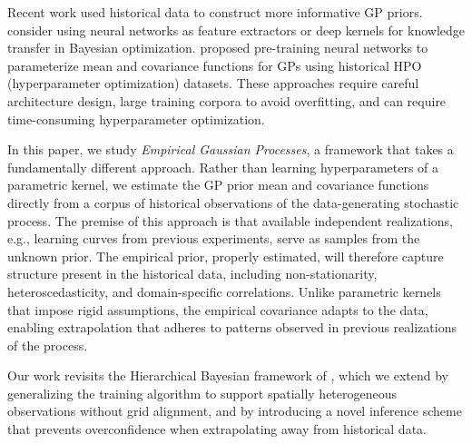 \documentclass{article}
\begin{document}
Recent work used historical data to construct more informative GP priors.
\citet{perrone2018scalable,wistuba2021few} consider using neural networks as feature extractors or deep kernels for knowledge transfer in Bayesian optimization. \citet{wang2024hyperbo} proposed pre-training neural networks to parameterize mean and covariance functions for GPs using historical HPO (hyperparameter optimization) datasets. These approaches require careful architecture design, large training corpora to avoid overfitting, and can require time-consuming hyperparameter optimization.

In this paper, we study \emph{Empirical Gaussian Processes}, a framework that takes a fundamentally different approach.
Rather than learning hyperparameters of a parametric kernel, we estimate the GP prior mean and covariance functions directly from a corpus of historical observations of the data-generating stochastic process.
The premise of this approach is that available independent realizations, e.g., learning curves from previous experiments, serve as samples from the unknown prior. %
The empirical prior, properly estimated, will therefore capture structure present in the historical data,
including non-stationarity, heteroscedasticity, and domain-specific correlations.
Unlike parametric kernels that impose rigid assumptions, the empirical covariance adapts to the data, enabling extrapolation that adheres to patterns observed in previous realizations of the process.

Our work revisits the Hierarchical Bayesian framework
of \citet{schwaighofer2004learningGPkernels},
which we extend by generalizing the training algorithm to support spatially heterogeneous observations without grid alignment, and by introducing a novel inference scheme that prevents  overconfidence when extrapolating away from historical data.
\end{document}
